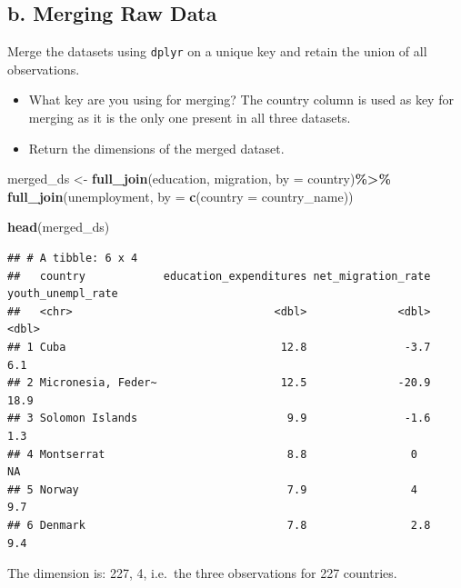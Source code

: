 \documentclass[
]{article}
\newenvironment{Shaded}{\begin{snugshade}}{\end{snugshade}}
\newcommand{\AttributeTok}[1]{\textcolor[rgb]{0.13,0.29,0.53}{#1}}
\newcommand{\FunctionTok}[1]{\textcolor[rgb]{0.13,0.29,0.53}{\textbf{#1}}}
\newcommand{\NormalTok}[1]{#1}
\newcommand{\OtherTok}[1]{\textcolor[rgb]{0.56,0.35,0.01}{#1}}
\newcommand{\SpecialCharTok}[1]{\textcolor[rgb]{0.81,0.36,0.00}{\textbf{#1}}}
\newcommand{\StringTok}[1]{\textcolor[rgb]{0.31,0.60,0.02}{#1}}
\providecommand{\tightlist}{%
  \setlength{\itemsep}{0pt}\setlength{\parskip}{0pt}}
\begin{document}
\subsection{b. Merging Raw Data}\label{b.-merging-raw-data}

Merge the datasets using \texttt{dplyr} on a unique key and retain the
union of all observations.

\begin{itemize}
\tightlist
\item
  What key are you using for merging? The country column is used as key
  for merging as it is the only one present in all three datasets.
\item
  Return the dimensions of the merged dataset.
\end{itemize}

\begin{Shaded}
\begin{Highlighting}[]
\NormalTok{merged\_ds }\OtherTok{\textless{}{-}} \FunctionTok{full\_join}\NormalTok{(education, migration, }\AttributeTok{by =} \StringTok{\textquotesingle{}country\textquotesingle{}}\NormalTok{)}\SpecialCharTok{\%\textgreater{}\%}
\FunctionTok{full\_join}\NormalTok{(unemployment, }\AttributeTok{by =} \FunctionTok{c}\NormalTok{(}\StringTok{\textquotesingle{}country\textquotesingle{}} \OtherTok{=} \StringTok{\textquotesingle{}country\_name\textquotesingle{}}\NormalTok{))}

\FunctionTok{head}\NormalTok{(merged\_ds)}
\end{Highlighting}
\end{Shaded}

\begin{verbatim}
## # A tibble: 6 x 4
##   country            education_expenditures net_migration_rate youth_unempl_rate
##   <chr>                               <dbl>              <dbl>             <dbl>
## 1 Cuba                                 12.8               -3.7               6.1
## 2 Micronesia, Feder~                   12.5              -20.9              18.9
## 3 Solomon Islands                       9.9               -1.6               1.3
## 4 Montserrat                            8.8                0                NA  
## 5 Norway                                7.9                4                 9.7
## 6 Denmark                               7.8                2.8               9.4
\end{verbatim}

The dimension is: 227, 4, i.e.~the three observations for 227 countries.
\end{document}
